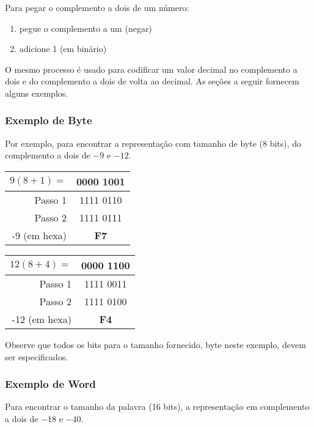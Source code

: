 Para pegar o complemento a dois de um número:
\begin{enumerate}
	\item pegue o complemento a um (negar)
	\item adicione 1 (em binário)
\end{enumerate}

O mesmo processo é usado para codificar um valor decimal no complemento a dois e do complemento a dois de volta ao decimal. As seções a seguir fornecem alguns exemplos.

\subsubsection{Exemplo de Byte}
Por exemplo, para encontrar a representação com tamanho de byte (8 bits), do complemento a dois de $ -9 $ e $ -12$.

\begin{minipage}{.5\textwidth}
\begin{tabular}{|r|c|}
	\hline
	$ 9 (8+1)= $ & 0000 1001\\ \hline
	Passo 1 & 1111 0110\\ \hline
	Passo 2 & 1111 0111\\ \hline
	-9 (em hexa) & \textbf{F7}\\ \hline
\end{tabular}
	
\end{minipage} 
\begin{minipage}{.5\textwidth}
\begin{tabular}{|r|c|}
	\hline
	$ 12 (8+4)= $ & 0000 1100\\ \hline
	Passo 1 & 1111 0011\\ \hline
	Passo 2 & 1111 0100\\ \hline
	-12 (em hexa) & \textbf{F4}\\ \hline
\end{tabular}
	
\end{minipage}%

\vspace{5mm}

Observe que todos os bits para o tamanho fornecido, byte neste exemplo, devem ser especificados.

\subsubsection{Exemplo de Word}
Para encontrar o tamanho da palavra (16 bits), a representação em complemento a dois de $ -18 $ e $ -40$.

